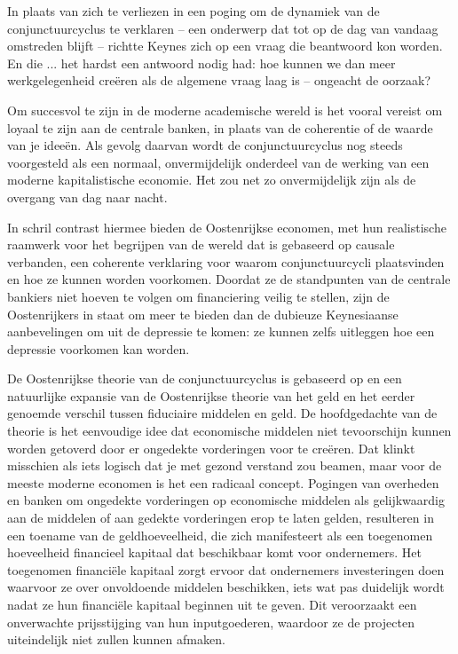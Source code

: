\begin{blockquotebox}
    In plaats van zich te verliezen in een poging om de dynamiek van de conjunctuurcyclus te verklaren -- een onderwerp dat tot op de dag van vandaag omstreden blijft -- richtte Keynes zich op een vraag die beantwoord kon worden. En die ... het hardst een antwoord nodig had: hoe kunnen we dan meer werkgelegenheid creëren als de algemene vraag laag is -- ongeacht de oorzaak?\footnotemark
\end{blockquotebox}

Om succesvol te zijn in de moderne academische wereld is het vooral vereist om loyaal te zijn aan de centrale banken, in plaats van de coherentie of de waarde van je ideeën. Als gevolg daarvan wordt de conjunctuurcyclus nog steeds voorgesteld als een normaal, onvermijdelijk onderdeel van de werking van een moderne kapitalistische economie. Het zou net zo onvermijdelijk zijn als de overgang van dag naar nacht.

In schril contrast hiermee bieden de Oostenrijkse economen, met hun realistische raamwerk voor het begrijpen van de wereld dat is gebaseerd op causale verbanden, een coherente verklaring voor waarom conjunctuurcycli plaatsvinden en hoe ze kunnen worden voorkomen. Doordat ze de standpunten van de centrale bankiers niet hoeven te volgen om financiering veilig te stellen, zijn de Oostenrijkers in staat om meer te bieden dan de dubieuze Keynesiaanse aanbevelingen om uit de depressie te komen: ze kunnen zelfs uitleggen hoe een depressie voorkomen kan worden.

De Oostenrijkse theorie van de conjunctuurcyclus is gebaseerd op en een natuurlijke expansie van de Oostenrijkse theorie van het geld en het eerder genoemde verschil tussen fiduciaire middelen en geld. De hoofdgedachte van de theorie is het eenvoudige idee dat economische middelen niet tevoorschijn kunnen worden getoverd door er ongedekte vorderingen voor te creëren. Dat klinkt misschien als iets logisch dat je met gezond verstand zou beamen, maar voor de meeste moderne economen is het een radicaal concept. Pogingen van overheden en banken om ongedekte vorderingen op economische middelen als gelijkwaardig aan de middelen of aan gedekte vorderingen erop te laten gelden, resulteren in een toename van de geldhoeveelheid, die zich manifesteert als een toegenomen hoeveelheid financieel kapitaal dat beschikbaar komt voor ondernemers. Het toegenomen financiële kapitaal zorgt ervoor dat ondernemers investeringen doen waarvoor ze over onvoldoende middelen beschikken, iets wat pas duidelijk wordt nadat ze hun financiële kapitaal beginnen uit te geven. Dit veroorzaakt een onverwachte prijsstijging van hun inputgoederen, waardoor ze de projecten uiteindelijk niet zullen kunnen afmaken.

